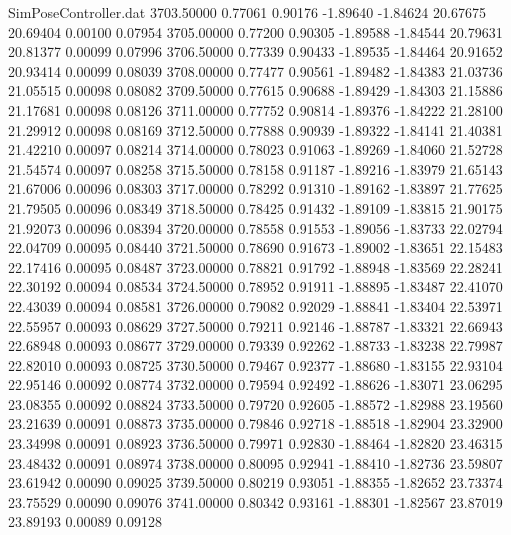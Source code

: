 \begin{filecontents}{SimPoseController.dat}
3703.50000    0.77061    0.90176    -1.89640   -1.84624   20.67675   20.69404    0.00100    0.07954
3705.00000    0.77200    0.90305    -1.89588   -1.84544   20.79631   20.81377    0.00099    0.07996
3706.50000    0.77339    0.90433    -1.89535   -1.84464   20.91652   20.93414    0.00099    0.08039
3708.00000    0.77477    0.90561    -1.89482   -1.84383   21.03736   21.05515    0.00098    0.08082
3709.50000    0.77615    0.90688    -1.89429   -1.84303   21.15886   21.17681    0.00098    0.08126
3711.00000    0.77752    0.90814    -1.89376   -1.84222   21.28100   21.29912    0.00098    0.08169
3712.50000    0.77888    0.90939    -1.89322   -1.84141   21.40381   21.42210    0.00097    0.08214
3714.00000    0.78023    0.91063    -1.89269   -1.84060   21.52728   21.54574    0.00097    0.08258
3715.50000    0.78158    0.91187    -1.89216   -1.83979   21.65143   21.67006    0.00096    0.08303
3717.00000    0.78292    0.91310    -1.89162   -1.83897   21.77625   21.79505    0.00096    0.08349
3718.50000    0.78425    0.91432    -1.89109   -1.83815   21.90175   21.92073    0.00096    0.08394
3720.00000    0.78558    0.91553    -1.89056   -1.83733   22.02794   22.04709    0.00095    0.08440
3721.50000    0.78690    0.91673    -1.89002   -1.83651   22.15483   22.17416    0.00095    0.08487
3723.00000    0.78821    0.91792    -1.88948   -1.83569   22.28241   22.30192    0.00094    0.08534
3724.50000    0.78952    0.91911    -1.88895   -1.83487   22.41070   22.43039    0.00094    0.08581
3726.00000    0.79082    0.92029    -1.88841   -1.83404   22.53971   22.55957    0.00093    0.08629
3727.50000    0.79211    0.92146    -1.88787   -1.83321   22.66943   22.68948    0.00093    0.08677
3729.00000    0.79339    0.92262    -1.88733   -1.83238   22.79987   22.82010    0.00093    0.08725
3730.50000    0.79467    0.92377    -1.88680   -1.83155   22.93104   22.95146    0.00092    0.08774
3732.00000    0.79594    0.92492    -1.88626   -1.83071   23.06295   23.08355    0.00092    0.08824
3733.50000    0.79720    0.92605    -1.88572   -1.82988   23.19560   23.21639    0.00091    0.08873
3735.00000    0.79846    0.92718    -1.88518   -1.82904   23.32900   23.34998    0.00091    0.08923
3736.50000    0.79971    0.92830    -1.88464   -1.82820   23.46315   23.48432    0.00091    0.08974
3738.00000    0.80095    0.92941    -1.88410   -1.82736   23.59807   23.61942    0.00090    0.09025
3739.50000    0.80219    0.93051    -1.88355   -1.82652   23.73374   23.75529    0.00090    0.09076
3741.00000    0.80342    0.93161    -1.88301   -1.82567   23.87019   23.89193    0.00089    0.09128

\end{filecontents}
